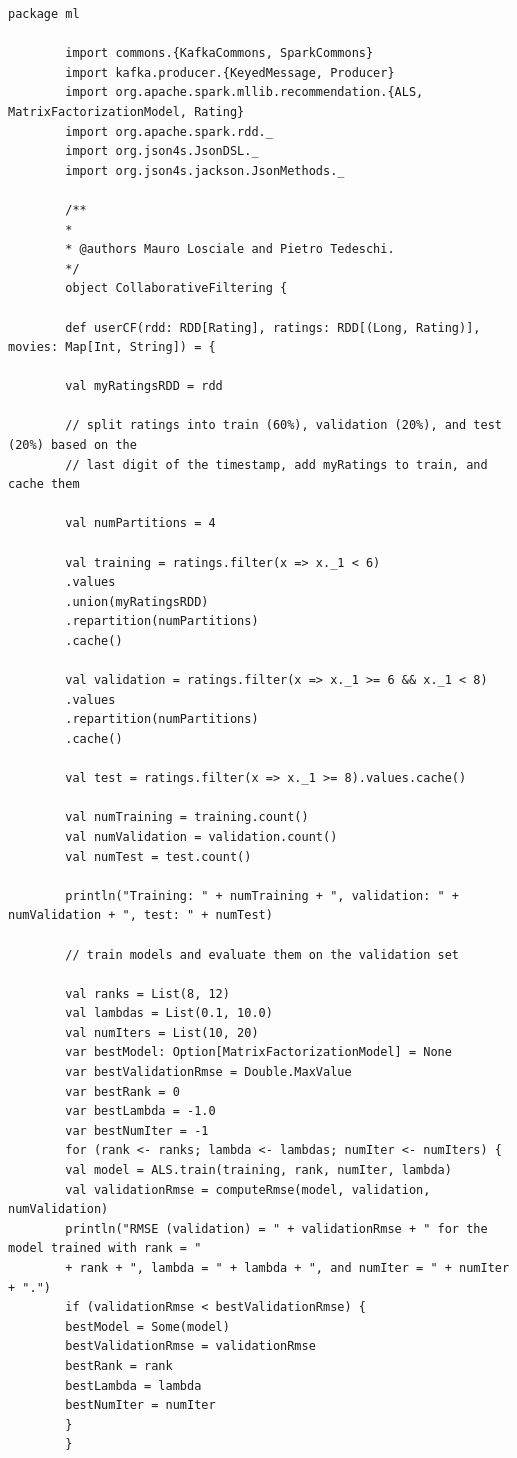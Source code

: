 \documentclass[12pt]{article}
\begin{document}
\begin{appendices}
\begin{lstlisting}[style=scalacode, caption=KafkaCommons.scala]
	\end{lstlisting}
	\begin{lstlisting}[style=scalacode, caption=CollaborativeFiltering.scala]
		package ml
		
		import commons.{KafkaCommons, SparkCommons}
		import kafka.producer.{KeyedMessage, Producer}
		import org.apache.spark.mllib.recommendation.{ALS, MatrixFactorizationModel, Rating}
		import org.apache.spark.rdd._
		import org.json4s.JsonDSL._
		import org.json4s.jackson.JsonMethods._
		
		/**
		*
		* @authors Mauro Losciale and Pietro Tedeschi.
		*/
		object CollaborativeFiltering {
		
		def userCF(rdd: RDD[Rating], ratings: RDD[(Long, Rating)], movies: Map[Int, String]) = {
		
		val myRatingsRDD = rdd
		
		// split ratings into train (60%), validation (20%), and test (20%) based on the
		// last digit of the timestamp, add myRatings to train, and cache them
		
		val numPartitions = 4
		
		val training = ratings.filter(x => x._1 < 6)
		.values
		.union(myRatingsRDD)
		.repartition(numPartitions)
		.cache()
		
		val validation = ratings.filter(x => x._1 >= 6 && x._1 < 8)
		.values
		.repartition(numPartitions)
		.cache()
		
		val test = ratings.filter(x => x._1 >= 8).values.cache()
		
		val numTraining = training.count()
		val numValidation = validation.count()
		val numTest = test.count()
		
		println("Training: " + numTraining + ", validation: " + numValidation + ", test: " + numTest)
		
		// train models and evaluate them on the validation set
		
		val ranks = List(8, 12)
		val lambdas = List(0.1, 10.0)
		val numIters = List(10, 20)
		var bestModel: Option[MatrixFactorizationModel] = None
		var bestValidationRmse = Double.MaxValue
		var bestRank = 0
		var bestLambda = -1.0
		var bestNumIter = -1
		for (rank <- ranks; lambda <- lambdas; numIter <- numIters) {
		val model = ALS.train(training, rank, numIter, lambda)
		val validationRmse = computeRmse(model, validation, numValidation)
		println("RMSE (validation) = " + validationRmse + " for the model trained with rank = "
		+ rank + ", lambda = " + lambda + ", and numIter = " + numIter + ".")
		if (validationRmse < bestValidationRmse) {
		bestModel = Some(model)
		bestValidationRmse = validationRmse
		bestRank = rank
		bestLambda = lambda
		bestNumIter = numIter
		}
		}
		

\end{lstlisting}
\end{appendices}
\end{document}
